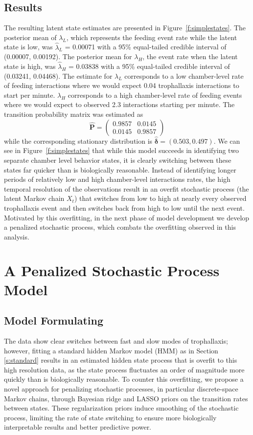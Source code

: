 \documentclass[cmbright,fleqn,referee]{envauth}
\begin{document}
\subsection{Results}
The resulting latent state estimates are presented in Figure~\ref{f:simplestates}. The posterior mean of $\lambda_L$, which represents the feeding event rate while the latent state is low, was $\hat{\lambda}_L$ = 0.00071 with a 95\% equal-tailed credible interval of (0.00007, 0.00192). The posterior mean for $\lambda_H$, the event rate when the latent state is high, was $\hat{\lambda}_H$ = 0.03838 with a 95\% equal-tailed credible interval of (0.03241, 0.04468). The estimate for $\lambda_L$ corresponds to a low chamber-level rate of feeding interactions where we would expect 0.04 trophallaxis interactions to start per minute. $\lambda_H$ corresponds to a high chamber-level rate of feeding events where we would expect to observed 2.3 interactions starting per minute. The transition probability matrix was estimated as 
\begin{equation}
\hat{\mathbf{P}} = \begin{pmatrix}
0.9857 & 0.0145\\
0.0145 & 0.9857 
\end{pmatrix}
\end{equation}
while the corresponding stationary distribution is $\hat{\bm{\delta}} = (0.503, 0.497)$. 
We can see in Figure~\ref{f:simplestates} that while this model succeeds in identifying two separate chamber level behavior states, it is clearly switching between these states far quicker than is biologically reasonable. 
Instead of identifying longer periods of relatively low and high chamber-level interactions rates, the high temporal resolution of the observations result in an overfit stochastic process (the latent Markov chain $X_t$) that switches from low to high at nearly every observed trophallaxis event and then switches back from high to low until the next event. Motivated by this overfitting, in the next phase of model development we develop a  penalized stochastic process, which combats the overfitting observed in this analysis. 
\section{A Penalized Stochastic Process Model}
\label{s:penalized}
\subsection{Model Formulating} 
The data show clear switches between fast and slow modes of trophallaxis; however, fitting a standard hidden Markov model (HMM) as in Section \ref{s:standard} results in an estimated hidden state process that is overfit to this high resolution data, as the state process fluctuates an order of magnitude more quickly than is biologically reasonable. To counter this overfitting, we propose a novel approach for penalizing stochastic processes, in particular discrete-space Markov chains, through Bayesian ridge and LASSO priors on the transition rates between states. These regularization priors induce smoothing of the stochastic process, limiting the rate of state switching to ensure more biologically interpretable results and better predictive power. 
\end{document}
